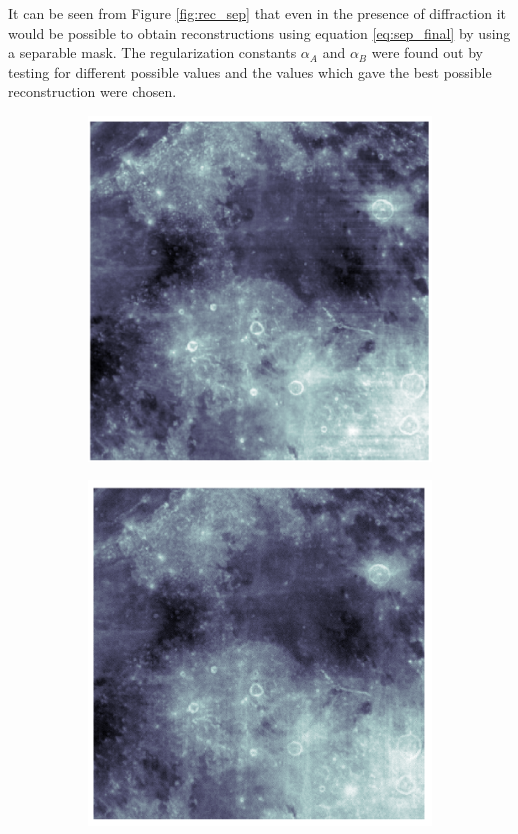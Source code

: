 It can be seen from Figure \ref{fig:rec_sep} that even in the presence of diffraction it would be possible to obtain reconstructions using equation \ref{eq:sep_final} by using a separable mask. The regularization constants $\alpha_{A}$ and $\alpha_{B}$ were found out by testing for different possible values and the values which gave the best possible reconstruction were chosen.
  \begin{figure}[ht]
    \centering
    \begin{subfigure}{0.5\textwidth}
    \centering
        \includegraphics[scale = 0.25]{pics/sep_mask_rec}
    \end{subfigure}%
    \begin{subfigure}{0.5\textwidth}
    \hspace{4cm}    
    \centering
        \includegraphics[scale= 0.25]{pics/sep_mask_rec_diff}

\end{subfigure}
\end{figure}
